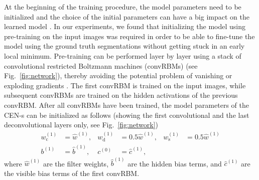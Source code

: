 At the beginning of the training procedure, the model parameters need to be
initialized and the choice of the initial parameters can have a big impact on
the learned model \cite{sutskever2013importance}. In our experiments, we found
that initializing the model using pre-training \cite{Hinton2006} on the input images was required in order
to be able to fine-tune the model using the ground truth segmentations without
getting stuck in an early local minimum. Pre-training can be performed layer by
layer \cite{Hinton2006b} using a stack of convolutional restricted Boltzmann
machines (convRBMs) \cite{lee2009convolutional} (see Fig.~\ref{fig:network}),
thereby avoiding the potential problem of vanishing or exploding gradients
\cite{hochreiter1991untersuchungen}. The first convRBM is trained on the input
images, while subsequent convRBMs are trained on the hidden activations of the
previous convRBM. After all convRBMs have been trained, the model parameters of
the CEN-s can be initialized as follows (showing the first convolutional and
the last deconvolutional layers only, see Fig.~\ref{fig:network})
\begin{align}
w_{\text{c}}^{(1)} &= \hat{w}^{(1)}, &
w_{\text{d}}^{(1)} &= 0.5\hat{w}^{(1)}, &
w_{\text{s}}^{(1)} &= 0.5\hat{w}^{(1)} \\
b^{(1)} &= \hat{b}^{(1)}, &
c^{(0)} &= \hat{c}^{(1)},
\end{align}
where $\hat{w}^{(1)}$ are the filter weights, $\hat{b}^{(1)}$ are the hidden
bias terms, and $\hat{c}^{(1)}$ are the visible bias terms of the first convRBM.

